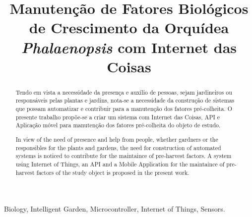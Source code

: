 \documentclass[conference]{IEEEtran}
\begin{document}
\title{Manutenção de Fatores Biológicos de Crescimento da Orquídea {\itshape{Phalaenopsis}} com Internet das Coisas}


\author{
\and
{}
\and
{}
\and
{}
}

\maketitle

\begin{abstract}
Tendo em vista a necessidade da presença e auxílio de pessoas, sejam jardineiros ou responsáveis pelas plantas e jardins, nota-se a necessidade da construção de sistemas que possam automatizar e contribuir para a manutenção dos fatores pré-colheita. O presente trabalho propõe-se a criar um sistema com Internet das Coisas, API e Aplicação móvel para manutenção dos fatores pré-colheita do objeto de estudo. 
\end{abstract}

\begin{abstract}
In view of the need of presence and help from people, whether gardners or the responsibles for the plants and gardens, the need for construction of automated systems is noticed to contribute for the maintaince of pre-harvest factors. A system using Internet of Things, an API and a Mobile Application for the maintaince of pre-harvest factors of the study object is proposed in the present work. 
\end{abstract}
\begin{IEEEkeywords}
Biology, Intelligent Garden, Microcontroller, Internet of Things, Sensors.
\end{IEEEkeywords}
\end{document}
